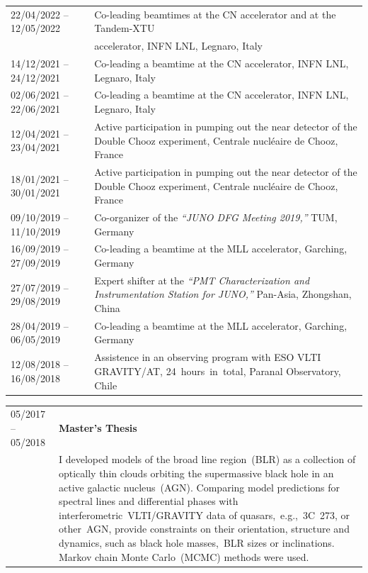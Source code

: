 \documentclass[letterpaper,12pt, oneside]{article}
\begin{document}
\begin{tabular}{@{} l p{12cm}}
	22/04/2022 – 12/05/2022 & Co-leading beamtimes at the CN accelerator and at the Tandem-XTU \\
	& accelerator, INFN LNL, Legnaro, Italy \vspace{0.35em}\\

	14/12/2021 – 24/12/2021 & Co-leading a beamtime at the CN accelerator, INFN LNL, Legnaro, Italy \\
	02/06/2021 – 22/06/2021 & Co-leading a beamtime at the CN accelerator, INFN LNL, Legnaro, Italy \\

	12/04/2021 – 23/04/2021 & Active participation in pumping out the near detector of the Double Chooz experiment, Centrale nucléaire de Chooz, France \vspace{0.35em}\\

	18/01/2021 – 30/01/2021 & Active participation in pumping out the near detector of the Double Chooz experiment, Centrale nucléaire de Chooz, France \vspace{0.35em}\\

	09/10/2019 – 11/10/2019 & Co-organizer of the \textit{“JUNO DFG Meeting 2019,”} {TUM, Germany} \vspace{0.35em}\\

	16/09/2019 – 27/09/2019 & Co-leading a beamtime at the MLL accelerator, Garching, Germany \vspace{0.35em}\\

	27/07/2019 – 29/08/2019 & Expert shifter at the \textit{“PMT Characterization and Instrumentation Station for JUNO,”} Pan-Asia, Zhongshan, China \vspace{0.3em} \\

	28/04/2019 – 06/05/2019 & Co-leading a beamtime at the MLL accelerator, Garching, Germany \vspace{0.35em}\\

	12/08/2018 – 16/08/2018 & Assistence in an observing program with ESO VLTI GRAVITY/AT, \mbox{24 hours in total}, {Paranal Observatory, Chile} \vspace{0.3em} \\

\end{tabular}
\newpage
\begin{tabular}{@{} l p{12cm}}
	05/2017 – 05/2018 & \textbf{Master's Thesis}\\
	& I developed models of the broad line region~(BLR) as a collection of optically thin clouds orbiting the supermassive black hole in an active galactic nucleus~(AGN). Comparing model predictions for spectral lines and differential phases with interferometric~VLTI/GRAVITY data of quasars,~e.g.,~3C~273, or other~AGN, provide constraints on their orientation, structure and dynamics, such as black hole masses,~BLR sizes or inclinations. Markov chain Monte Carlo~(MCMC) methods were used. \\
\end{tabular}\par
\end{document}
